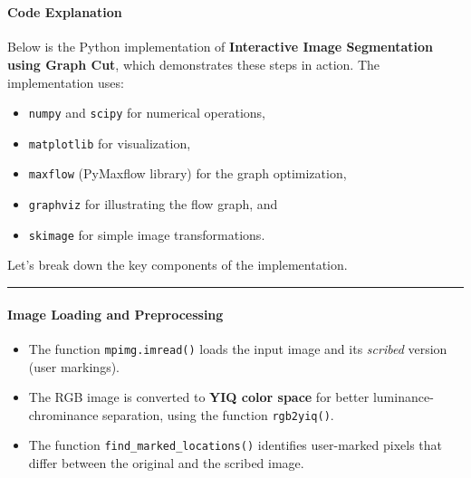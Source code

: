\documentclass[11pt]{article}
\providecommand{\tightlist}{%
      \setlength{\itemsep}{0pt}\setlength{\parskip}{0pt}}
\begin{document}
    \begin{center}
    \end{center}
    { \hspace*{\fill} \\}
    
    \hypertarget{code-explanation}{%
\paragraph{\texorpdfstring{\textbf{Code
Explanation}}{Code Explanation}}\label{code-explanation}}

Below is the Python implementation of \textbf{Interactive Image
Segmentation using Graph Cut}, which demonstrates these steps in action.
The implementation uses:

\begin{itemize}
\tightlist
\item
  \texttt{numpy} and \texttt{scipy} for numerical operations,
\item
  \texttt{matplotlib} for visualization,
\item
  \texttt{maxflow} (PyMaxflow library) for the graph optimization,
\item
  \texttt{graphviz} for illustrating the flow graph, and
\item
  \texttt{skimage} for simple image transformations.
\end{itemize}

Let's break down the key components of the implementation.

\begin{center}\rule{0.5\linewidth}{0.5pt}\end{center}

\hypertarget{image-loading-and-preprocessing}{%
\paragraph{\texorpdfstring{\textbf{Image Loading and
Preprocessing}}{Image Loading and Preprocessing}}\label{image-loading-and-preprocessing}}

\begin{itemize}
\tightlist
\item
  The function \texttt{mpimg.imread()} loads the input image and its
  \emph{scribed} version (user markings).
\item
  The RGB image is converted to \textbf{YIQ color space} for better
  luminance-chrominance separation, using the function
  \texttt{rgb2yiq()}.
\item
  The function \texttt{find\_marked\_locations()} identifies user-marked
  pixels that differ between the original and the scribed image.
\end{itemize}
\end{document}

